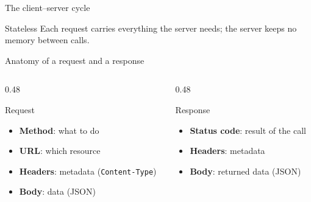\documentclass[aspectratio=169,10pt]{beamer}
\begin{document}
\begin{frame}{The client--server cycle}
\begin{center}
\end{center}
\vspace{0.3cm}
\begin{block}{Stateless}
Each request carries everything the server needs; the server keeps no memory between calls.
\end{block}
\end{frame}

\begin{frame}{Anatomy of a request and a response}
\begin{columns}[T]
\begin{column}{0.48\textwidth}
\begin{exampleblock}{Request}
\begin{itemize}
\item \textbf{Method}: what to do
\item \textbf{URL}: which resource
\item \textbf{Headers}: metadata (\texttt{Content-Type})
\item \textbf{Body}: data (JSON)
\end{itemize}
\end{exampleblock}
\end{column}
\begin{column}{0.48\textwidth}
\begin{exampleblock}{Response}
\begin{itemize}
\item \textbf{Status code}: result of the call
\item \textbf{Headers}: metadata
\item \textbf{Body}: returned data (JSON)
\end{itemize}
\end{exampleblock}
\end{column}
\end{columns}
\end{frame}
\end{document}
